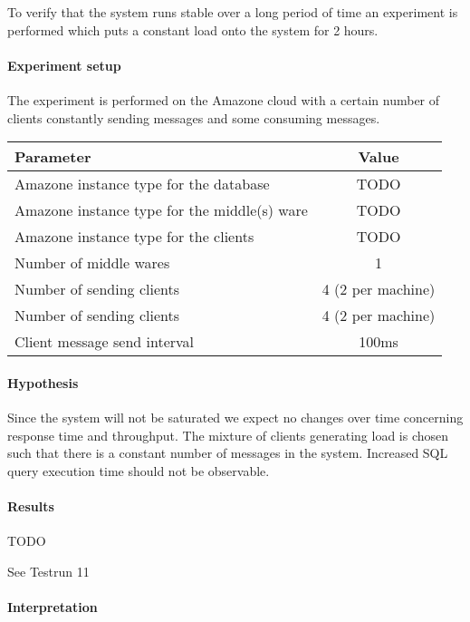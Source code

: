 \documentclass[milestone1.tex]{subfiles}
\begin{document}

To verify that the system runs stable over a long period of time an experiment is performed which puts a constant load onto the system for 2 hours.

\paragraph{Experiment setup}
The experiment is performed on the Amazone cloud with a certain number of clients constantly sending messages and some consuming messages. 

\begin{tabular}{|l|c|}
\hline 
Parameter & Value \\
\hline 
Amazone instance type for the database & TODO \\ 
Amazone instance type for the middle(s) ware& TODO \\ 
Amazone instance type for the clients & TODO \\ 
Number of middle wares & 1 \\ 
Number of sending clients & 4 (2 per machine) \\ 
Number of sending clients & 4 (2 per machine) \\ 
Client message send interval & 100ms \\
\hline 
\end{tabular}

\paragraph{Hypothesis}
Since the system will not be saturated we expect no changes over time concerning response time and throughput. The mixture of clients generating load is chosen such that there is a constant number of messages in the system. Increased SQL query execution time should not be observable.

\paragraph{Results}

TODO

See Testrun 11


\paragraph{Interpretation}
\end{document}
